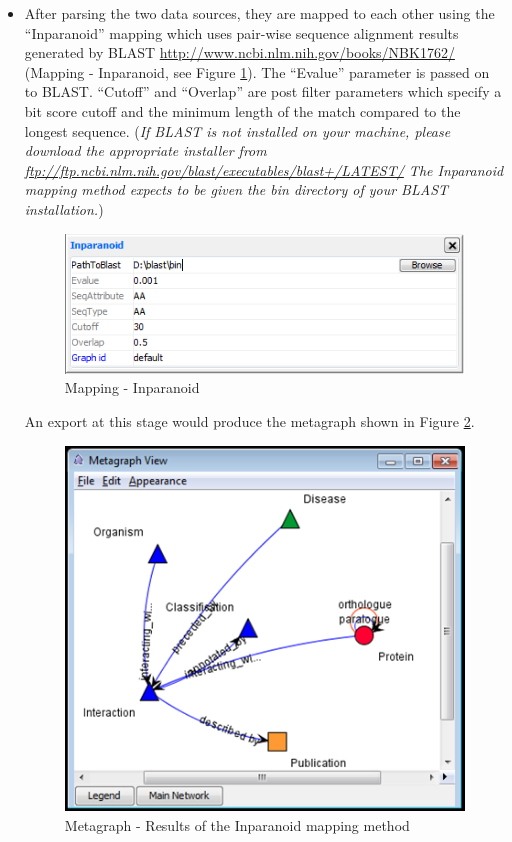 \begin{itemize}
\item After parsing the two data sources, they are mapped to each other using the ``Inparanoid'' mapping which uses pair-wise sequence alignment results 
generated by BLAST \url{http://www.ncbi.nlm.nih.gov/books/NBK1762/} (Mapping - Inparanoid, see Figure \ref{fig:integrator_inparanoid}). 
The ``Evalue'' parameter is passed on to BLAST.
``Cutoff'' and ``Overlap'' are post filter parameters which specify a bit score cutoff and the minimum length of the match compared to the longest sequence.
({\em{If BLAST is not installed on your machine, please download the appropriate installer from 
\url{ftp://ftp.ncbi.nlm.nih.gov/blast/executables/blast+/LATEST/} 
The Inparanoid mapping method expects to be given the bin directory of your BLAST installation.}})
\begin{figure}[H]
\centering
\includegraphics[scale=0.6]{images/Oct12/inparanoid.png} 
\caption{Mapping - Inparanoid}
\label{fig:integrator_inparanoid}
\end{figure}
An export at this stage would produce the metagraph shown in Figure \ref{fig:inparanoid_results}.
\begin{figure}[H]
\centering
\includegraphics[scale=0.6]{images/Oct12/inparanoid_results.png} 
\caption{Metagraph - Results of the Inparanoid mapping method}
\label{fig:inparanoid_results}
\end{figure}


\end{itemize}
